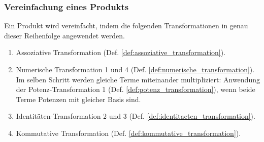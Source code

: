 \documentclass[11pt]{article}
\newcommand{\lab}[1]{(Def. \ref{#1})}
\begin{document}
\subsubsection{Vereinfachung eines Produkts}
Ein Produkt wird vereinfacht, indem die folgenden 
Transformationen in genau dieser Reihenfolge angewendet werden.
\begin{enumerate}
  \item Assoziative Transformation \lab{def:assoziative_transformation}.
  \item Numerische Transformation 1 und 4 \lab{def:numerische_transformation}. 
        Im selben Schritt werden gleiche Terme miteinander multipliziert: Anwendung der Potenz-Transformation 1 
        \lab{def:potenz_transformation}, wenn beide Terme Potenzen mit gleicher Basis sind.
  \item Identitäten-Transformation 2 und 3 \lab{def:identitaeten_transformation}.
  \item Kommutative Transformation \lab{def:kommutative_transformation}.
\end{enumerate}
\end{document}
